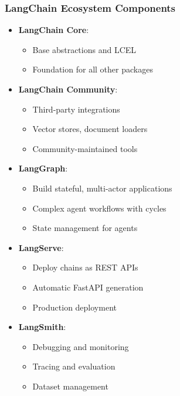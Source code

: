 \begin{frame}\frametitle{LangChain Ecosystem Components}

\begin{itemize}
\item \textbf{LangChain Core}:
    \begin{itemize}
    \item Base abstractions and LCEL
    \item Foundation for all other packages
    \end{itemize}

\item \textbf{LangChain Community}:
    \begin{itemize}
    \item Third-party integrations
    \item Vector stores, document loaders
    \item Community-maintained tools
    \end{itemize}

\item \textbf{LangGraph}:
    \begin{itemize}
    \item Build stateful, multi-actor applications
    \item Complex agent workflows with cycles
    \item State management for agents
    \end{itemize}

\item \textbf{LangServe}:
    \begin{itemize}
    \item Deploy chains as REST APIs
    \item Automatic FastAPI generation
    \item Production deployment
    \end{itemize}

\item \textbf{LangSmith}:
    \begin{itemize}
    \item Debugging and monitoring
    \item Tracing and evaluation
    \item Dataset management
    \end{itemize}
\end{itemize}



\end{frame}

